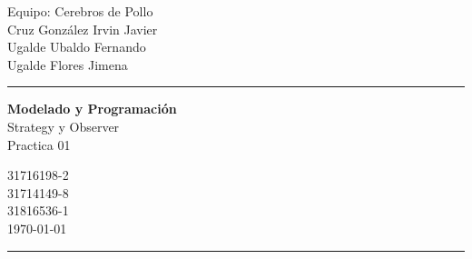 \documentclass[a4paper,10pt]{article}
\begin{document}
\fancyhead[C]{}
\begin{minipage}{0.295\textwidth} 
\raggedright
Equipo: Cerebros de Pollo\\    
\footnotesize 
\colorbox[rgb]{0.06, 0.75, 0.99}{Cruz González Irvin Javier}
\\\colorbox[rgb]{0.67, 0.88, 0.69}{Ugalde Ubaldo Fernando}
\\\colorbox[rgb]{0.96, 0.76, 0.76}{Ugalde Flores Jimena}

\textcolor[rgb]{0.0, 0.72, 0.92}{\medskip\hrule}
\end{minipage}
\begin{minipage}{0.4\textwidth} 
\centering 
\large 
\textbf{Modelado y Programación}\\ 
\normalsize 
Strategy y Observer\\Practica 01\\
\end{minipage}
\begin{minipage}{0.295\textwidth} 
\raggedleft
\footnotesize
\colorbox[rgb]{0.06, 0.75, 0.99}{31716198-2}\\
\colorbox[rgb]{0.67, 0.88, 0.69}{31714149-8}\\
\colorbox[rgb]{0.96, 0.76, 0.76}{31816536-1}\\
\today
\textcolor[rgb]{0.0, 0.72, 0.92}{\medskip\hrule}
\end{minipage}
\end{document}
